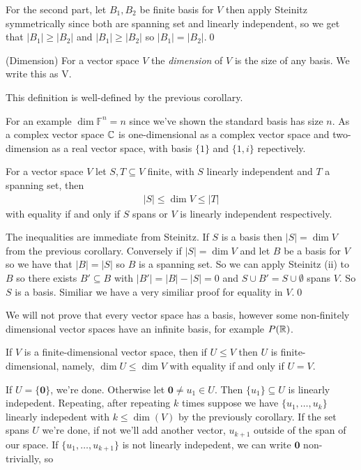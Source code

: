 \documentclass{article}
\newcommand{\F}{\mathbb{F}}
\begin{document}
For the second part, let $ B_1,B_2 $ be finite basis for $ V $ then apply Steinitz symmetrically since both are spanning set and linearly independent, so we get that $ |B_1|\ge |B_2| $ and $ |B_1|\ge |B_2| $ so $ |B_1|=|B_2| $.\qed
\begin{definition}
	(Dimension) For a vector space $ V $ the \textit{dimension} of $ V $ is the size of any basis. We write this as \dim V.
\end{definition}
This definition is well-defined by the previous corollary.\par
For an example $ \dim \F^n=n $ since we've shown the standard basis has size $ n $. As a complex vector space $ \mathbb{C} $ is one-dimensional as a complex vector space and two-dimension as a real vector space, with basis $ \{1\} $ and $ \{1,i\} $ repectively.
\begin{corollary}
  For a vector space $ V $ let $ S,T\subseteq V $ finite, with $ S $ linearly independent and $ T $ a spanning set, then
  \begin{align*}
	  |S|\le \dim V\le |T|
	  \end{align*}
	  with equality if and only if $ S $ spans or $ V $ is linearly independent respectively.
\end{corollary}
\pf The inequalities are immediate from Steinitz. If $ S $ is a basis then $ |S|=\dim V $ from the previous corollary. Conversely if $ |S|=\dim V $ and let $ B $ be a basis for $ V $ so we have that $ |B|=|S| $ so $ B $ is a spanning set. So we can apply Steinitz (ii) to $ B $ so there exists $ B'\subseteq B $ with $ |B'|=|B|-|S|=0 $ and $ S\cup B'=S\cup \emptyset $ spans $ V $. So $ S $ is a basis. Similiar we have a very similiar proof for equality in $ V $.\qed\par We will not prove that every vector space has a basis, however some non-finitely dimensional vector spaces have an infinite basis, for example $ P(\mathbb{R}) $.
\begin{proposition}
  If $ V $ is a finite-dimensional vector space, then if $ U\le V $ then $ U $ is finite-dimensional, namely, $ \dim U \le \dim V $ with equality if and only if $ U=V $.
\end{proposition}
\pf If $ U=\{\mathbf 0\} $, we're done. Otherwise let $ \mathbf 0\ne u_1\in U $. Then $ \{u_1\}\subseteq U $ is linearly indepedent. Repeating, after repeating $ k $ times suppose we have $ \{u_1,\dots, u_k\} $ linearly indepedent with $ k\le \dim(V) $ by the previously corollary. If the set spans $ U $ we're done, if not we'll add another vector, $ u_{k+1} $ outside of the span of our space. If $ \{u_1,\dots, u_{k+1}\} $ is not linearly indepedent, we can write $ \mathbf 0 $ non-trivially, so
\end{document}
